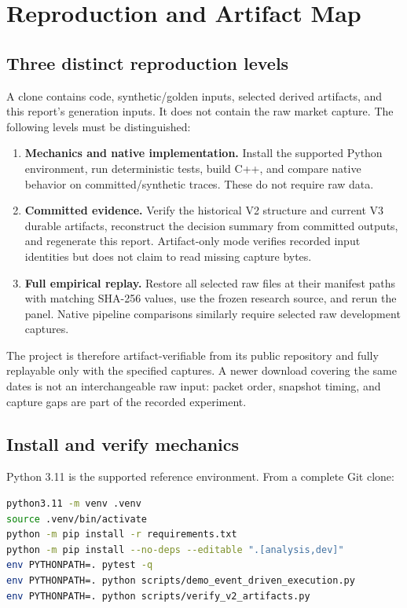 \section{Reproduction and Artifact Map}\label{sec:reproduction}

\subsection{Three distinct reproduction levels}

A clone contains code, synthetic/golden inputs, selected derived artifacts,
and this report's generation inputs. It does not contain the raw market
capture. The following levels must be distinguished:

\begin{enumerate}
\item \textbf{Mechanics and native implementation.} Install the supported
Python environment, run deterministic tests, build C++, and compare native
behavior on committed/synthetic traces. These do not require raw data.
\item \textbf{Committed evidence.} Verify the historical V2 structure and
current V3 durable artifacts, reconstruct the decision summary from committed
outputs, and regenerate this report. Artifact-only mode verifies recorded
input identities but does not claim to read missing capture bytes.
\item \textbf{Full empirical replay.} Restore all selected raw files at their
manifest paths with matching SHA-256 values, use the frozen research source,
and rerun the panel. Native pipeline comparisons similarly require selected
raw development captures.
\end{enumerate}

The project is therefore artifact-verifiable from its public repository and
fully replayable only with the specified captures. A newer download covering
the same dates is not an interchangeable raw input: packet order, snapshot
timing, and capture gaps are part of the recorded experiment.

\subsection{Install and verify mechanics}

Python 3.11 is the supported reference environment. From a complete Git clone:

\begin{lstlisting}[language=bash]
python3.11 -m venv .venv
source .venv/bin/activate
python -m pip install -r requirements.txt
python -m pip install --no-deps --editable ".[analysis,dev]"
env PYTHONPATH=. pytest -q
env PYTHONPATH=. python scripts/demo_event_driven_execution.py
env PYTHONPATH=. python scripts/verify_v2_artifacts.py
\end{lstlisting}

